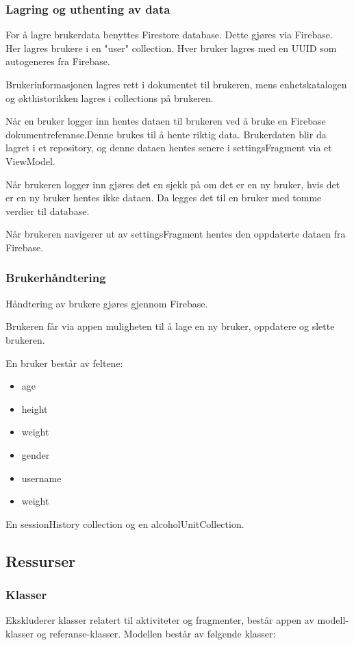 \subsubsection{Lagring og uthenting av data}
For å lagre brukerdata benyttes Firestore database. Dette gjøres via Firebase. Her lagres brukere i en "user" collection. Hver bruker lagres med en UUID som autogeneres fra Firebase. 

Brukerinformasjonen lagres rett i dokumentet til brukeren, mens enhetskatalogen og økthistorikken lagres i collections på brukeren. 

Når en bruker logger inn hentes dataen til brukeren ved å bruke en Firebase dokumentreferanse.Denne brukes til å hente riktig data. Brukerdaten blir da lagret i et repository, og denne dataen hentes senere i settingsFragment via et ViewModel. 

Når brukeren logger inn gjøres det en sjekk på om det er en ny bruker, hvis det er en ny bruker hentes ikke dataen. 
Da legges det til en bruker med tomme verdier til database. 

Når brukeren navigerer ut av settingsFragment hentes den oppdaterte dataen fra Firebase.

\subsubsection{Brukerhåndtering}
Håndtering av brukere gjøres gjennom Firebase.

Brukeren får via appen muligheten til å lage en ny bruker, oppdatere og slette brukeren.

En bruker består av feltene:
\begin{itemize}
    \item age
    \item height
    \item weight
    \item gender
    \item username
    \item weight
\end{itemize}

En sessionHistory collection og en alcoholUnitCollection.

\subsection{Ressurser}

\subsubsection{Klasser}
Ekskluderer klasser relatert til aktiviteter og fragmenter, består appen av modell-klasser og referanse-klasser. Modellen består av følgende klasser:


